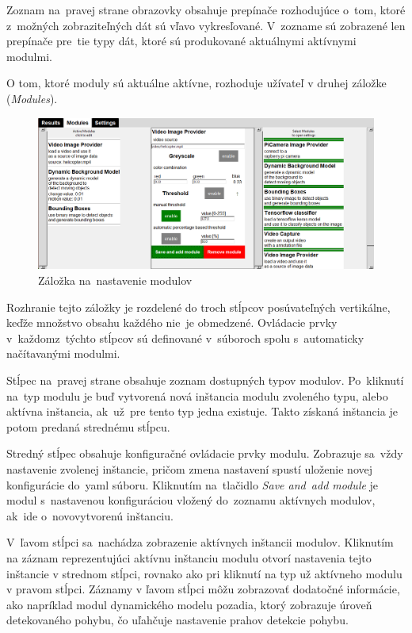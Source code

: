         Zoznam na~pravej strane obrazovky obsahuje prepínače rozhodujúce o~tom, ktoré z~možných  zobraziteľných dát sú vľavo vykresľované. V~zozname sú zobrazené len prepínače pre~tie typy dát, ktoré sú produkované aktuálnymi aktívnymi modulmi.

        O tom, ktoré moduly sú aktuálne aktívne, rozhoduje užívateľ v druhej záložke (\emph{Modules}). 

        \begin{figure}[H]
            \centering
            \includegraphics[width=\textwidth]{obrazky/new_app/modules_window_motion_detection.png}
            \caption{Záložka na~nastavenie modulov}
        \end{figure}

        Rozhranie tejto záložky je rozdelené do troch stĺpcov posúvateľných vertikálne, keďže množstvo obsahu každého nie~je obmedzené. Ovládacie prvky v~každom\linebreak z~týchto stĺpcov sú definované v~súboroch spolu s~automaticky načítavanými modulmi.

        Stĺpec na~pravej strane obsahuje zoznam dostupných typov modulov. Po~kliknutí na~typ modulu je buď vytvorená nová inštancia modulu zvoleného typu, alebo aktívna inštancia, ak~už~pre tento typ jedna existuje. Takto získaná inštancia je potom predaná strednému stĺpcu.

        Stredný stĺpec obsahuje konfiguračné ovládacie prvky modulu. Zobrazuje sa~vždy nastavenie zvolenej inštancie, pričom zmena nastavení spustí uloženie novej konfigurácie do~yaml súboru. Kliknutím na~tlačidlo \emph{Save and~add module} je modul s~nastavenou konfiguráciou vložený do~zoznamu aktívnych modulov, ak~ide o~novovytvorenú inštanciu.
        
        V~ľavom stĺpci sa~nachádza zobrazenie aktívnych inštancii modulov. Kliknutím na záznam reprezentujúci aktívnu inštanciu modulu otvorí nastavenia tejto inštancie v strednom stĺpci, rovnako ako pri kliknutí na typ už aktívneho modulu v pravom stĺpci. Záznamy v ľavom stĺpci môžu zobrazovať dodatočné informácie, ako napríklad modul dynamického modelu pozadia, ktorý zobrazuje úroveň detekovaného pohybu, čo uľahčuje nastavenie prahov detekcie pohybu.

